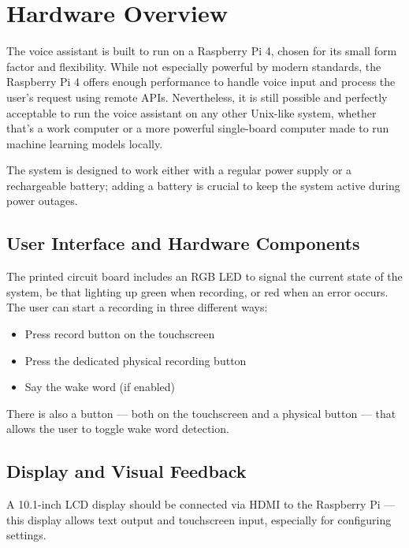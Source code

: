 \section{Hardware Overview}

The voice assistant is built to run on a Raspberry Pi 4, chosen for its small form factor and flexibility.
While not especially powerful by modern standards, the Raspberry Pi 4 offers enough performance to handle voice input and process
the user's request using remote APIs.
Nevertheless, it is still possible and perfectly acceptable to run the voice assistant on any other Unix-like system,
whether that's a work computer or a more powerful single-board computer made to run machine learning models locally.

The system is designed to work either with a regular power supply or a rechargeable battery;
adding a battery is crucial to keep the system active during power outages.

\subsection{User Interface and Hardware Components}

The printed circuit board includes an RGB LED to signal the current state of the system,
be that lighting up green when recording, or red when an error occurs.
The user can start a recording in three different ways:
\begin{itemize}
    \item Press record button on the touchscreen
    \item Press the dedicated physical recording button
    \item Say the wake word (if enabled)
\end{itemize}
There is also a button --- both on the touchscreen and a physical button ---
that allows the user to toggle wake word detection.

\subsection{Display and Visual Feedback}

A 10.1-inch LCD display should be connected via HDMI to the Raspberry Pi ---
this display allows text output and touchscreen input, especially for configuring settings.

